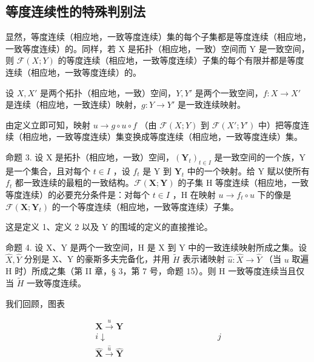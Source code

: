 \subsection{等度连续性的特殊判别法}

显然，等度连续（相应地，一致等度连续）集的每个子集都是等度连续（相应地，一致等度连续）的。同样，若 X 是拓扑（相应地，一致）空间而 Y 是一致空间，则 \(\mathcal{F}(X;Y)\) 的等度连续（相应地，一致等度连续）子集的每个有限并都是等度连续（相应地，一致等度连续）的。

设 \(X, X'\) 是两个拓扑（相应地，一致）空间，\(Y, Y'\) 是两个一致空间，\(f: X \to X'\) 是连续（相应地，一致连续）映射，\(g: Y \to Y'\) 是一致连续映射。

由定义立即可知，映射 \(u \rightarrow g \circ u \circ f\) （由 \(\mathcal{F}(X; Y)\) 到 \(\mathcal{F}(X'; Y')\) 中）把等度连续（相应地，一致等度连续）集变换成等度连续（相应地，一致等度连续）集。

命题 3. 设 X 是拓扑（相应地，一致）空间，\((\mathbf{Y}_{t})_{t \in I}\) 是一致空间的一个族，Y 是一个集合，且对每个 \(t \in I\) ，设 \(f_{t}\) 是 Y 到 \(\mathbf{Y}_{t}\) 中的一个映射。给 Y 赋以使所有 \(f_{t}\) 都一致连续的最粗的一致结构。\(\mathcal{F}(\mathbf{X}; \mathbf{Y})\) 的子集 H 等度连续（相应地，一致等度连续）的必要充分条件是：对每个 \(t \in I\) ，H 在映射 \(u \to f_{t} \circ u\) 下的像是 \(\mathcal{F}(\mathbf{X}; \mathbf{Y}_{t})\) 的一个等度连续（相应地，一致等度连续）子集。

这是定义 1、定义 2 以及 Y 的围域的定义的直接推论。

命题 4. 设 X、Y 是两个一致空间，H 是 X 到 Y 中的一致连续映射所成之集。设 \(\hat{X}, \hat{Y}\) 分别是 X、Y 的豪斯多夫完备化，并用 \(\tilde{H}\) 表示诸映射 \(\hat{u}: \hat{X} \to \hat{Y}\) （当 \(u\) 取遍 H 时）所成之集（第 II 章，§ 3，第 7 号，命题 15）。则 H 一致等度连续当且仅当 \(\tilde{H}\) 一致等度连续。

我们回顾，图表

\[
\begin{array}{c} \mathbf {X} \xrightarrow {u} \mathbf {Y} \\ i \downarrow \quad \quad \quad \quad \quad \quad \quad \quad \quad \quad \quad \quad \quad j \\ \hat {\mathbf {X}} \xrightarrow {\hat {u}} \hat {\mathbf {Y}} \end{array}\tag{1}
\]

